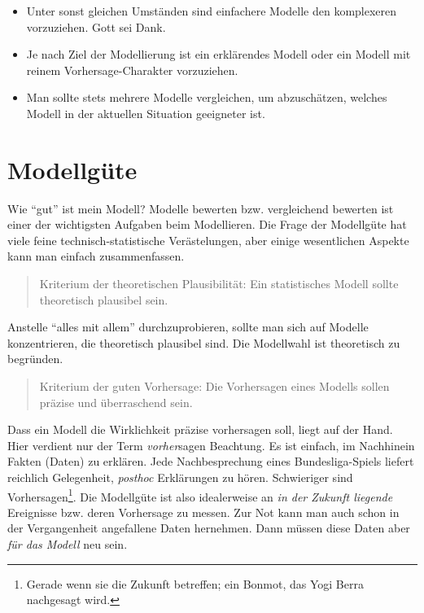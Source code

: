 \documentclass[12pt,ngerman,]{book}
\let\rmarkdownfootnote\footnote%
\def\footnote{\protect\rmarkdownfootnote}
\begin{document}
\begin{itemize}
\item
  Unter sonst gleichen Umständen sind einfachere Modelle den komplexeren
  vorzuziehen. Gott sei Dank.
\item
  Je nach Ziel der Modellierung ist ein erklärendes Modell oder ein
  Modell mit reinem Vorhersage-Charakter vorzuziehen.
\item
  Man sollte stets mehrere Modelle vergleichen, um abzuschätzen, welches
  Modell in der aktuellen Situation geeigneter ist.
\end{itemize}

\section{Modellgüte}\label{modellgute}

Wie ``gut'' ist mein Modell? Modelle bewerten bzw. vergleichend bewerten
ist einer der wichtigsten Aufgaben beim Modellieren. Die Frage der
Modellgüte hat viele feine technisch-statistische Verästelungen, aber
einige wesentlichen Aspekte kann man einfach zusammenfassen.

\begin{quote}
Kriterium der theoretischen Plausibilität: Ein statistisches Modell
sollte theoretisch plausibel sein.
\end{quote}

Anstelle ``alles mit allem'' durchzuprobieren, sollte man sich auf
Modelle konzentrieren, die theoretisch plausibel sind. Die Modellwahl
ist theoretisch zu begründen.

\begin{quote}
Kriterium der guten Vorhersage: Die Vorhersagen eines Modells sollen
präzise und überraschend sein.
\end{quote}

Dass ein Modell die Wirklichkeit präzise vorhersagen soll, liegt auf der
Hand. Hier verdient nur der Term \emph{vorher}sagen Beachtung. Es ist
einfach, im Nachhinein Fakten (Daten) zu erklären. Jede Nachbesprechung
eines Bundesliga-Spiels liefert reichlich Gelegenheit, \emph{posthoc}
Erklärungen zu hören. Schwieriger sind Vorhersagen\footnote{Gerade wenn
  sie die Zukunft betreffen; ein Bonmot, das Yogi Berra nachgesagt wird.}.
Die Modellgüte ist also idealerweise an \emph{in der Zukunft liegende}
Ereignisse bzw. deren Vorhersage zu messen. Zur Not kann man auch schon
in der Vergangenheit angefallene Daten hernehmen. Dann müssen diese
Daten aber \emph{für das Modell} neu sein.
\end{document}
